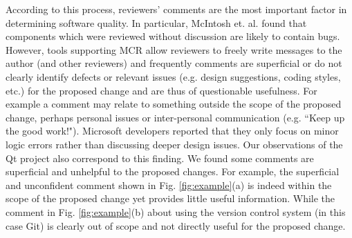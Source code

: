 According to this process, reviewers' comments are the most important factor in determining software quality. In particular, McIntosh et. al. \cite{Mcintosh} found that components which were reviewed without discussion are likely to contain bugs. However, tools supporting MCR allow reviewers to freely write messages to the author (and other reviewers) and frequently comments are superficial or do not clearly identify defects or relevant issues (e.g. design suggestions, coding styles, etc.) for the proposed change and are thus of questionable usefulness. For example a comment may relate to something outside the scope of the proposed change, perhaps personal issues or inter-personal communication (e.g. ``Keep up the good work!"). Microsoft developers reported that they only focus on minor logic errors rather than discussing deeper design\cite{Bacchelli2013a} issues. Our observations of the Qt project also correspond to this finding. We found some comments are superficial and unhelpful to the proposed changes. For example, the superficial and unconfident comment shown in Fig. \ref{fig:example}(a) is indeed within the scope of the proposed change yet provides little useful information. While the comment in Fig. \ref{fig:example}(b) about using the version control system (in this case Git) is clearly out of scope and not directly useful for the proposed change. 



